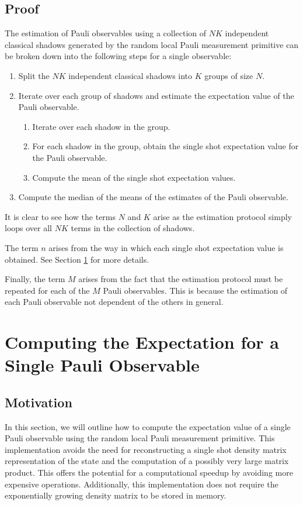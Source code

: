 \documentclass[12pt]{article}
\begin{document}
    \subsection{Proof}
    The estimation of Pauli observables using a collection of $NK$ independent classical shadows generated by the random local Pauli measurement primitive can be broken down into the following steps for a single observable:
    \begin{enumerate}
        \item Split the $NK$ independent classical shadows into $K$ groups of size $N$.
        \item Iterate over each group of shadows and estimate the expectation value of the Pauli observable.
        \begin{enumerate}
            \item Iterate over each shadow in the group.
            \item For each shadow in the group, obtain the single shot expectation value for the Pauli observable.
            \item Compute the mean of the single shot expectation values.
        \end{enumerate}
        \item Compute the median of the means of the estimates of the Pauli observable.
    \end{enumerate}

    It is clear to see how the terms $N$ and $K$ arise as the estimation protocol simply loops over all $NK$ terms in the collection of shadows.

    The term $n$ arises from the way in which each single shot expectation value is obtained. See Section \ref{sec:expectation} for more details.

    Finally, the term $M$ arises from the fact that the estimation protocol must be repeated for each of the $M$ Pauli observables. This is because the estimation of each Pauli observable not dependent of the others in general.

    \section{Computing the Expectation for a Single Pauli Observable} \label{sec:expectation}
    \subsection{Motivation}
    In this section, we will outline how to compute the expectation value of a single Pauli observable using the random local Pauli measurement primitive. This implementation avoids the need for reconstructing a single shot density matrix representation of the state and the computation of a possibly very large matrix product. This offers the potential for a computational speedup by avoiding more expensive operations. Additionally, this implementation does not require the exponentially growing density matrix to be stored in memory.
\end{document}
